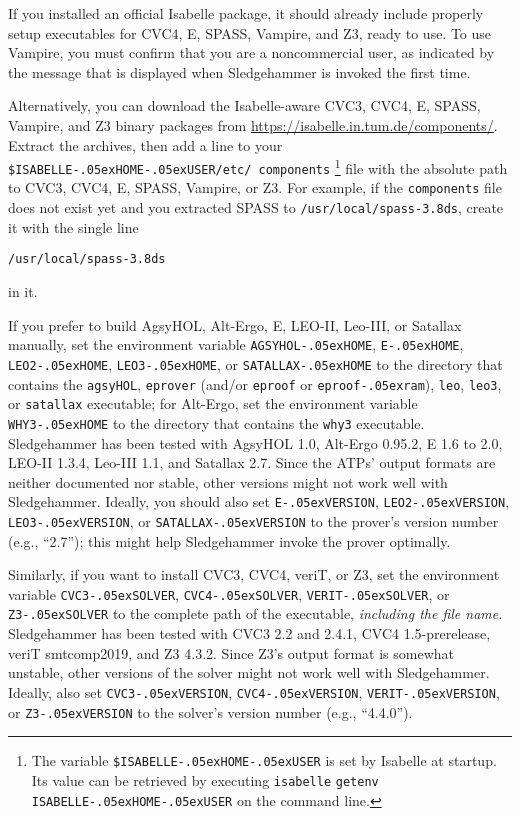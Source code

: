 \documentclass[a4paper,12pt]{article}
\newcommand\download{\url{https://isabelle.in.tum.de/components/}}
\renewcommand\_{\hbox{\textunderscore\kern-.05ex}}
\begin{document}
\begin{sloppy}
\begin{enum}
\item[\labelitemi] If you installed an official Isabelle package, it should
already include properly setup executables for CVC4, E, SPASS, Vampire, and Z3,
ready to use. To use Vampire, you must confirm that you are a noncommercial
user, as indicated by the message that is displayed when Sledgehammer is
invoked the first time.

\item[\labelitemi] Alternatively, you can download the Isabelle-aware CVC3,
CVC4, E, SPASS, Vampire, and Z3 binary packages from \download. Extract the
archives, then add a line to your \texttt{\$ISABELLE\_HOME\_USER\slash etc\slash
components}%
\footnote{The variable \texttt{\$ISABELLE\_HOME\_USER} is set by Isabelle at
startup. Its value can be retrieved by executing \texttt{isabelle}
\texttt{getenv} \texttt{ISABELLE\_HOME\_USER} on the command line.}
file with the absolute path to CVC3, CVC4, E, SPASS, Vampire, or Z3. For
example, if the \texttt{components} file does not exist yet and you extracted
SPASS to \texttt{/usr/local/spass-3.8ds}, create it with the single line

\prew
\texttt{/usr/local/spass-3.8ds}
\postw

in it.

\item[\labelitemi] If you prefer to build AgsyHOL, Alt-Ergo, E, LEO-II,
Leo-III, or Satallax manually, set the environment variable
\texttt{AGSYHOL\_HOME}, \texttt{E\_HOME}, \texttt{LEO2\_HOME},
\texttt{LEO3\_HOME}, or \texttt{SATALLAX\_HOME}
to the directory that contains the \texttt{agsyHOL},
\texttt{eprover} (and/or \texttt{eproof} or \texttt{eproof\_ram}),
\texttt{leo}, \texttt{leo3}, or \texttt{satallax} executable;
for Alt-Ergo, set the environment variable \texttt{WHY3\_HOME} to the
directory that contains the \texttt{why3} executable. Sledgehammer has been
tested with AgsyHOL 1.0, Alt-Ergo 0.95.2, E 1.6 to 2.0, LEO-II 1.3.4, Leo-III
1.1, and Satallax 2.7. Since the ATPs' output formats are neither documented
nor stable, other versions might not work well with Sledgehammer. Ideally, you
should also set \texttt{E\_VERSION}, \texttt{LEO2\_VERSION},
\texttt{LEO3\_VERSION}, or \texttt{SATALLAX\_VERSION} to the prover's version
number (e.g., ``2.7''); this might help Sledgehammer invoke the prover
optimally.

Similarly, if you want to install CVC3, CVC4, veriT, or Z3, set the environment
variable \texttt{CVC3\_\allowbreak SOLVER}, \texttt{CVC4\_\allowbreak SOLVER},
\texttt{VERIT\_\allowbreak SOLVER}, or \texttt{Z3\_SOLVER} to the complete path
of the executable, \emph{including the file name}. Sledgehammer has been tested
with CVC3 2.2 and 2.4.1, CVC4 1.5-prerelease, veriT smtcomp2019, and Z3 4.3.2.
Since Z3's output format is somewhat unstable, other versions of the solver
might not work well with Sledgehammer. Ideally, also set
\texttt{CVC3\_VERSION}, \texttt{CVC4\_VERSION}, \texttt{VERIT\_VERSION}, or
\texttt{Z3\_VERSION} to the solver's version number (e.g., ``4.4.0'').
\end{enum}
\end{sloppy}
\end{document}
